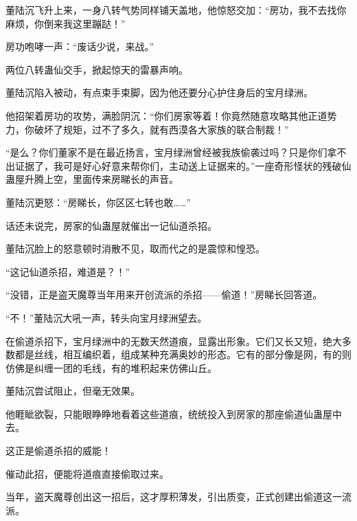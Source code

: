\begin{this_body}
董陆沉飞升上来，一身八转气势同样铺天盖地，他惊怒交加：“房功，我不去找你麻烦，你倒来我这里蹦跶！”

房功咆哮一声：“废话少说，来战。”

两位八转蛊仙交手，掀起惊天的雷暴声响。

董陆沉陷入被动，有点束手束脚，因为他还要分心护住身后的宝月绿洲。

他招架着房功的攻势，满脸阴沉：“你们房家等着！你竟然随意攻略其他正道势力，你破坏了规矩，过不了多久，就有西漠各大家族的联合制裁！”

“是么？你们董家不是在最近扬言，宝月绿洲曾经被我族偷袭过吗？只是你们拿不出证据了，我可是好心好意来帮你们，主动送上证据来的。”一座奇形怪状的残破仙蛊屋升腾上空，里面传来房睇长的声音。

董陆沉更怒：“房睇长，你区区七转也敢……”

话还未说完，房家的仙蛊屋就催出一记仙道杀招。

董陆沉脸上的怒意顿时消散不见，取而代之的是震惊和惶恐。

“这记仙道杀招，难道是？！”

“没错，正是盗天魔尊当年用来开创流派的杀招——偷道！”房睇长回答道。

“不！”董陆沉大吼一声，转头向宝月绿洲望去。

在偷道杀招下，宝月绿洲中的无数天然道痕，显露出形象。它们又长又短，绝大多数都是丝线，相互编织着，组成某种充满奥妙的形态。它有的部分像是网，有的则仿佛是纠缠一团的毛线，有的堆积起来仿佛山丘。

董陆沉尝试阻止，但毫无效果。

他睚眦欲裂，只能眼睁睁地看着这些道痕，统统投入到房家的那座偷道仙蛊屋中去。

这正是偷道杀招的威能！

催动此招，便能将道痕直接偷取过来。

当年，盗天魔尊创出这一招后，这才厚积薄发，引出质变，正式创建出偷道这一流派。

\end{this_body}

